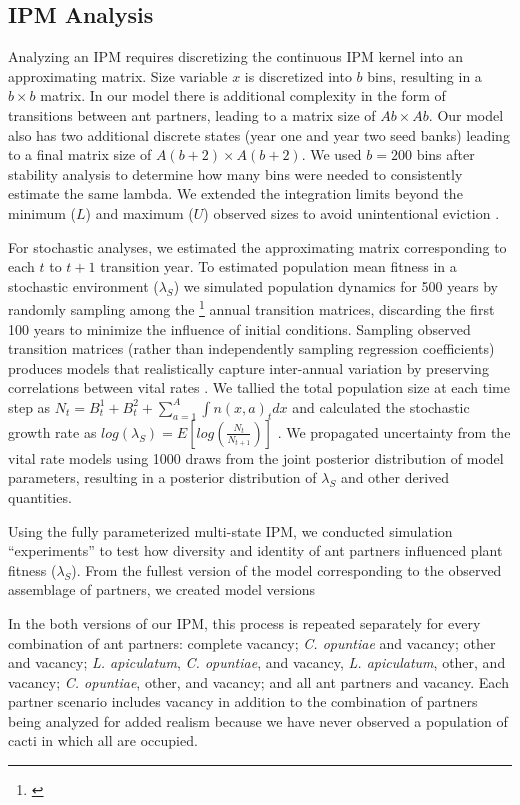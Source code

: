 \documentclass[11pt]{article}
\newcommand{\tom}[2]{{\color{red}{#1}}\footnote{\textit{\color{red}{#2}}}}
\begin{document}
\subsection*{IPM Analysis}
Analyzing an IPM requires discretizing the continuous IPM kernel into an approximating matrix. 
Size variable $x$ is discretized into $b$ bins, resulting in a $b \times b$ matrix.
In our model there is additional complexity in the form of transitions between ant partners, leading to a matrix size of $A b \times A b$.
Our model also has two additional discrete states (year one and year two seed banks) leading to a final matrix size of $A(b+2) \times A(b+2)$.
We used $b = 200$ bins after stability analysis to determine how many bins were needed to consistently estimate the same lambda.
We extended the integration limits beyond the minimum ($L$) and maximum ($U$) observed sizes to avoid unintentional eviction \cite{Williams2012}. 

For stochastic analyses, we estimated the approximating matrix corresponding to each $t$ to $t+1$ transition year. 
To estimated population mean fitness in a stochastic environment ($\lambda_{S}$) we simulated population dynamics for 500 years by randomly sampling among the \tom{19}{Is this right? The number of transition matrices should be one fewer than then number of years, but I don't remember what happens with 2020.} annual transition matrices, discarding the first 100 years to minimize the influence of initial conditions. 
Sampling observed transition matrices (rather than independently sampling regression coefficients) produces models that realistically capture inter-annual variation by preserving correlations between vital rates \cite{metcalf2015statistical}.
We tallied the total population size at each time step as  $N_{t} = B^1_{t} + B^2_{t} + \sum_{a=1}^{A}\int n(x,a)_{t}dx$ and calculated the stochastic growth rate as $log(\lambda_S) = E[log(\frac{N_{t}}{N_{t+1}})]$ \cite{rees2009integral}.
We propagated uncertainty from the vital rate models using 1000 draws from the joint posterior distribution of model parameters, resulting in a posterior distribution of $\lambda_{S}$ and other derived quantities.

Using the fully parameterized multi-state IPM, we conducted simulation ``experiments'' to test how diversity and identity of ant partners influenced plant fitness ($\lambda_{S}$). 
From the fullest version of the model corresponding to the observed assemblage of partners, we created model versions 

In the both versions of our IPM, this process is repeated separately for every combination of ant partners: complete vacancy; \textit{C. opuntiae} and vacancy; other and vacancy; \textit{L. apiculatum}, \textit{C. opuntiae}, and vacancy, \textit{L. apiculatum}, other, and vacancy; \textit{C. opuntiae}, other, and vacancy; and all ant partners and vacancy.
Each partner scenario includes vacancy in addition to the combination of partners being analyzed for added realism because we have never observed a population of cacti in which all are occupied. 
\end{document}
